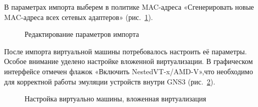\documentclass[
  english,
  russian,
  12pt,
  a4paper,
  DIV=11,
  numbers=noendperiod]{scrreprt}
\begin{document}
В параметрах импорта выберем в политике MAC-адреса «Сгенерировать новые
MAC-адреса всех сетевых адаптеров» (рис.~\ref{fig-007}).

\begin{figure}


\caption{\label{fig-007}Редактирование параметров импорта}

\end{figure}%

После импорта виртуальной машины потребовалось настроить её параметры.
Особое внимание уделено настройке вложенной виртуализации. В графическом
интерфейсе отмечен флажок «Включить NestedVT-x/AMD-V»,что необходимо для
корректной работы эмуляции устройств внутри GNS3 (рис.~\ref{fig-008}).

\begin{figure}


\caption{\label{fig-008}Настройка виртуально машины, вложенная
виртуализация}

\end{figure}%
\end{document}
